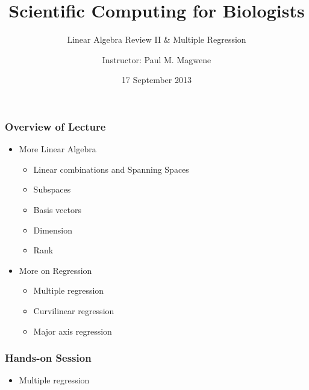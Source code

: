 \documentclass{beamer}
\title{Scientific Computing for Biologists}
\subtitle{Linear Algebra Review II \& Multiple Regression} %
\author{Instructor: Paul M. Magwene}
\date{17 September 2013}
\begin{document}
\begin{frame}
\titlepage
\end{frame}

\begin{frame}
  \frametitle{Overview of Lecture}

\begin{itemize}
		\item More Linear Algebra
		\begin{itemize}
			\item Linear combinations and Spanning Spaces
			\item Subspaces
			\item Basis vectors
			\item Dimension
			\item Rank
		\end{itemize}
		\item More on Regression
		\begin{itemize}
		  \item Multiple regression
		  \item Curvilinear regression
		  \item Major axis regression
		\end{itemize}
\end{itemize}

\end{frame}

\begin{frame}
  \frametitle{Hands-on Session}
\begin{itemize}
    \item Multiple regression
\end{itemize}


\end{frame}
\end{document}
